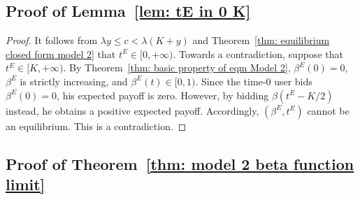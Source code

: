 \documentclass[12pt, letterpaper]{article}
\begin{document}
\subsection{Proof of Lemma~\ref{lem: tE in 0 K}}
\begin{proof} %
It follows from $\lambda y \le c < \lambda (K + y)$ and Theorem~\ref{thm: equilibrium closed form model 2} that $t^E \in [0, + \infty)$. Towards a contradiction, suppose that $t^E \in [K, + \infty)$. By Theorem~\ref{thm: basic property of eqm Model 2},   $\beta^E(0) = 0$, $\beta^E$ is strictly increasing, and $\beta^E(t) \in [0, 1)$. Since the  time-$0$ user bids $\beta^E(0) = 0$, his expected payoff is zero. However, by bidding $\beta(t^E - K/2)$ instead, 
he obtains a positive expected payoff. Accordingly, $(\beta^E, t^E)$ cannot be an equilibrium. This is a contradiction.

\end{proof} %



\subsection{Proof of Theorem~\ref{thm: model 2 beta function limit}}\label{subsec: model 2 beta function limit}
\end{document}
